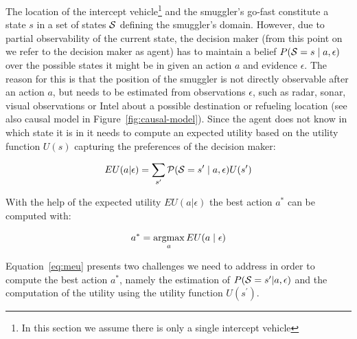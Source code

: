 \documentclass[conference]{IEEEtran}
\begin{document}
The location of the intercept vehicle\footnote{In this section we assume there is only a single intercept vehicle} and the smuggler's go-fast constitute a state $s$ in a set of states $\S$ defining the smuggler's domain. However, due to partial observability of the current state, the decision maker (from this point on we refer to the decision maker as  agent) has to maintain a belief $P(\S = s \mid  a, \epsilon)$ over the possible states it might be in given an action $a$ and evidence $\epsilon$. The reason for this is that the position of the smuggler is not directly observable after an action $a$, but needs to be estimated from observations $\epsilon$, such as radar, sonar, visual observations or Intel about a possible destination or refueling location (see also causal model in Figure~\ref{fig:causal-model}). Since the agent does not know in which state it is in it needs to compute an expected utility based on the utility function $U(s)$ capturing the preferences of the decision maker:

\begin{eqnarray}
 EU(a|\epsilon) = \sum_{s^\prime}\P(\S = s^\prime\mid a, \epsilon)U(s^\prime)
\end{eqnarray}

With the help of the expected utility $EU(a|\epsilon)$ the best action $a^*$ can be computed with:

\begin{eqnarray}\label{eq:meu}
 a^* = \argmax_a EU(a\mid \epsilon)
\end{eqnarray}

Equation~\ref{eq:meu} presents two challenges we need to address in order to compute the best action $a^*$, namely the estimation of $P(\S = s^\prime|a, \epsilon)$ and the computation of the utility using the utility function $U(s^\prime)$.
\end{document}
